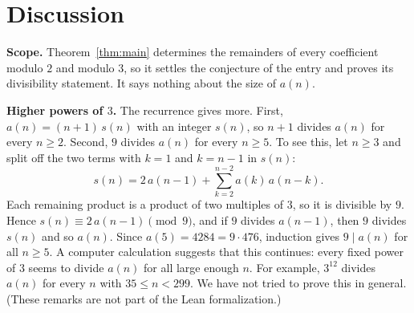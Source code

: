 \documentclass[11pt,a4paper]{article}
\theoremstyle{definition}
\theoremstyle{remark}
\newcommand{\para}[1]{\par\medskip\noindent\textbf{#1}\enspace}
\begin{document}
\section{Discussion}\label{sec:discussion}

\para{Scope.} Theorem~\ref{thm:main} determines the remainders of every coefficient modulo $2$ and modulo $3$, so it
settles the conjecture of the entry and proves its divisibility statement. It says nothing about the size of $a(n)$.

\para{Higher powers of $3$.} The recurrence gives more. First, $a(n)=(n+1)\,s(n)$ with an integer $s(n)$, so $n+1$
divides $a(n)$ for every $n\ge2$. Second, $9$ divides $a(n)$ for every $n\ge5$. To see this, let $n\ge3$ and split off the
two terms with $k=1$ and $k=n-1$ in $s(n)$:
\[
s(n)=2\,a(n-1)+\sum_{k=2}^{n-2}a(k)\,a(n-k).
\]
Each remaining product is a product of two multiples of $3$, so it is divisible by $9$. Hence $s(n)\equiv2\,a(n-1)
\pmod9$, and if $9$ divides $a(n-1)$, then $9$ divides $s(n)$ and so $a(n)$. Since $a(5)=4284=9\cdot476$, induction
gives $9\mid a(n)$ for all $n\ge5$. A computer calculation suggests that this continues: every fixed power of $3$ seems to
divide $a(n)$ for all large enough $n$. For example, $3^{12}$ divides $a(n)$ for every $n$ with $35\le n<299$. We have not
tried to prove this in general. (These remarks are not part of the Lean formalization.)
\end{document}
